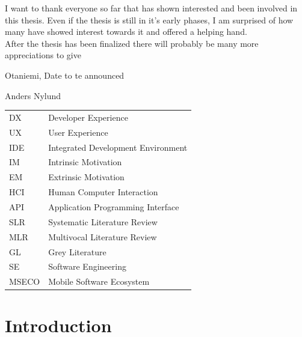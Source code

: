 \documentclass[english, 12pt, a4paper, sci, utf8, a-1b, online]{aaltothesis}
\begin{document}
I want to thank everyone so far that has shown interested and been involved in this thesis. Even if the thesis is still in it's early phases, I am surprised of how many have showed interest towards it and offered a helping hand.
\newline \\ After the thesis has been finalized there will probably be many more appreciations to give

\vspace{5cm}
Otaniemi, Date to te announced

\vspace{5mm}
{\hfill Anders Nylund \hspace{1cm}}

\newpage


\thesistableofcontents


\begin{tabular}{ll}
  DX    & Developer Experience               \\
  UX    & User Experience                    \\
  IDE   & Integrated Development Environment \\
  IM    & Intrinsic Motivation               \\
  EM    & Extrinsic Motivation               \\
  HCI   & Human Computer Interaction         \\
  API   & Application Programming Interface  \\
  SLR   & Systematic Literature Review       \\
  MLR   & Multivocal Literature Review       \\
  GL    & Grey Literature                    \\
  SE    & Software Engineering               \\
  MSECO & Mobile Software Ecosystem          \\
\end{tabular}

\cleardoublepage
\section{Introduction}
\end{document}
